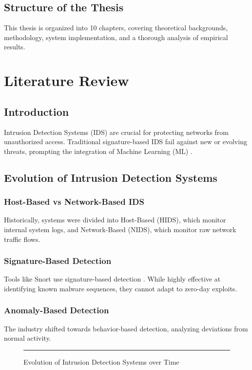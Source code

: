 \documentclass[12pt, a4paper]{report}
\begin{document}
\section{Structure of the Thesis}
This thesis is organized into 10 chapters, covering theoretical backgrounds, methodology, system implementation, and a thorough analysis of empirical results.

\chapter{Literature Review}
\section{Introduction}
Intrusion Detection Systems (IDS) are crucial for protecting networks from unauthorized access. Traditional signature-based IDS fail against new or evolving threats, prompting the integration of Machine Learning (ML) \cite{ref1}. 

\section{Evolution of Intrusion Detection Systems}
\subsection{Host-Based vs Network-Based IDS}
Historically, systems were divided into Host-Based (HIDS), which monitor internal system logs, and Network-Based (NIDS), which monitor raw network traffic flows.
\subsection{Signature-Based Detection}
Tools like Snort use signature-based detection \cite{ref5}. While highly effective at identifying known malware sequences, they cannot adapt to zero-day exploits.
\subsection{Anomaly-Based Detection}
The industry shifted towards behavior-based detection, analyzing deviations from normal activity.

\begin{figure}[htbp]
    \centering
    \rule{0.8\textwidth}{5cm}
    \caption{Evolution of Intrusion Detection Systems over Time}
    \label{fig:ids_evolution}
\end{figure}
\end{document}
